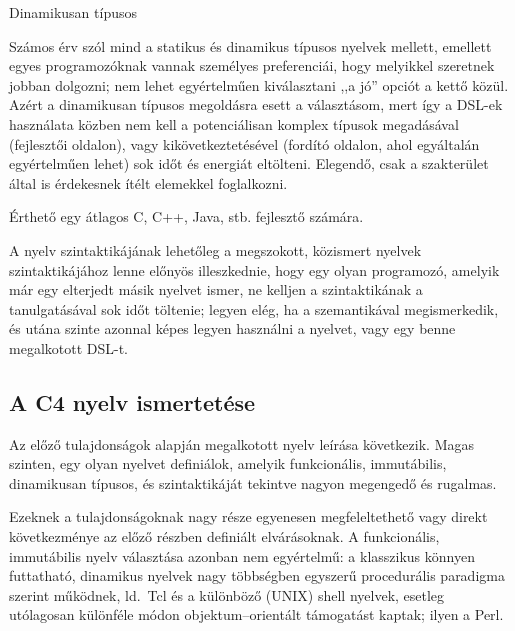 \begin{property}\label{prop:dynamic}
    Dinamikusan típusos

    Számos érv szól mind a statikus és dinamikus típusos nyelvek mellett, emellett egyes programozóknak vannak személyes preferenciái, hogy melyikkel szeretnek jobban dolgozni; nem lehet egyértelműen kiválasztani ,,a jó'' opciót a kettő közül.
    Azért a dinamikusan típusos megoldásra esett a választásom, mert így a \gls{DSL}-ek használata közben nem kell a potenciálisan komplex típusok megadásával (fejlesztői oldalon), vagy kikövetkeztetésével (fordító oldalon, ahol egyáltalán egyértelműen lehet) sok időt és energiát eltölteni.
    Elegendő, csak a szakterület által is érdekesnek ítélt elemekkel foglalkozni.
\end{property}

\begin{property}\label{prop:easy}
    Érthető egy átlagos C, C++, Java, stb. fejlesztő számára.

    A nyelv szintaktikájának lehetőleg a megszokott, közismert nyelvek szintaktikájához lenne előnyös illeszkednie, hogy egy olyan programozó, amelyik már egy elterjedt másik nyelvet ismer, ne kelljen a szintaktikának a tanulgatásával sok időt töltenie; legyen elég, ha a szemantikával megismerkedik, és utána szinte azonnal képes legyen használni a nyelvet, vagy egy benne megalkotott \gls{DSL}-t.
\end{property}

\subsection{A C4 nyelv ismertetése}\label{subsec:c4:desc:c4}

Az előző tulajdonságok alapján megalkotott nyelv leírása következik.
Magas szinten, egy olyan nyelvet definiálok, amelyik funkcionális, immutábilis, dinamikusan típusos, és szintaktikáját tekintve nagyon megengedő és rugalmas.

Ezeknek a tulajdonságoknak nagy része egyenesen megfeleltethető vagy direkt következménye az előző részben definiált elvárásoknak.
A funkcionális, immutábilis nyelv választása azonban nem egyértelmű: a klasszikus könnyen futtatható, dinamikus nyelvek nagy többségben egyszerű procedurális paradigma szerint működnek, ld.~Tcl és a különböző (UNIX) shell nyelvek, esetleg utólagosan különféle módon objektum--orientált támogatást kaptak; ilyen \pl a Perl.

